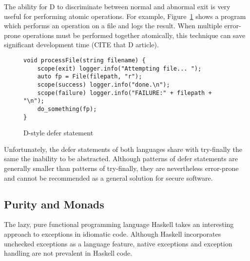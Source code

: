 \documentclass[11pt]{article}
\newcommand{\maybePage}{\newpage}
\begin{document}
The ability for D to discriminate between normal and abnormal exit is very useful for performing atomic operations.
For example, Figure~\ref{Dscope} shows a program which performs an operation on a file and logs the result.
When multiple error-prone operations must be performed together atomically, this technique can save significant development time (CITE that D article).

\begin{figure}
\caption{D-style defer statement}
\label{Dscope}

\begin{verbatim}
void processFile(string filename) {
    scope(exit) logger.info("Attempting file... ");
    auto fp = File(filepath, "r");
    scope(success) logger.info("done.\n");
    scope(failure) logger.info("FAILURE:" + filepath + "\n");
    do_something(fp);
}
\end{verbatim}

\end{figure}

Unfortunately, the defer statements of both languages share with try-finally the same the inability to be abstracted.
Although patterns of defer statements are generally smaller than patterns of try-finally, they are nevertheless error-prone and cannot be recommended as a general solution for secure software.




\maybePage
\subsection{Purity and Monads}
\label{subsect:exceptionMonads}
The lazy, pure functional programming language Haskell takes an interesting approach to exceptions in idiomatic code.
Although Haskell incorporates unchecked exceptions as a language feature, native exceptions and exception handling are not prevalent in Haskell code.
\end{document}
